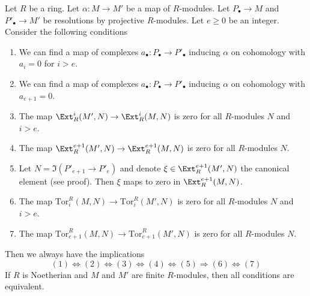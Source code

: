 \begin{lemma}
\label{lemma-characterize-vanishing-tor-ext-above-e}
Let $R$ be a ring. Let $\alpha : M \to M'$ be a map of $R$-modules.
Let $P_\bullet \to M$ and $P'_\bullet \to M'$ be resolutions by
projective $R$-modules. Let $e \geq 0$ be an integer.
Consider the following conditions
\begin{enumerate}
\item We can find a map of complexes $a_\bullet : P_\bullet \to P'_\bullet$
inducing $\alpha$ on cohomology with $a_i = 0$ for $i > e$.
\item We can find a map of complexes $a_\bullet : P_\bullet \to P'_\bullet$
inducing $\alpha$ on cohomology with $a_{e + 1} = 0$.
\item The map $\Ext^i_R(M', N) \to \Ext^i_R(M, N)$ is zero
for all $R$-modules $N$ and $i > e$.
\item The map $\Ext^{e + 1}_R(M', N) \to \Ext^{e + 1}_R(M, N)$ is zero
for all $R$-modules $N$.
\item Let $N = \Im(P'_{e + 1} \to P'_e)$ and denote
$\xi \in \Ext^{e + 1}_R(M', N)$ the canonical element (see proof).
Then $\xi$ maps to zero in $\Ext^{e + 1}_R(M, N)$.
\item The map $\text{Tor}_i^R(M, N) \to \text{Tor}_i^R(M', N)$
is zero for all $R$-modules $N$ and $i > e$.
\item The map $\text{Tor}_{e + 1}^R(M, N) \to \text{Tor}_{e + 1}^R(M', N)$
is zero for all $R$-modules $N$.
\end{enumerate}
Then we always have the implications
$$
(1) \Leftrightarrow (2) \Leftrightarrow (3) \Leftrightarrow (4)
\Leftrightarrow (5) \Rightarrow (6) \Leftrightarrow (7)
$$
If $R$ is Noetherian and $M$ and $M'$ are finite $R$-modules, then
all conditions are equivalent.
\end{lemma}

